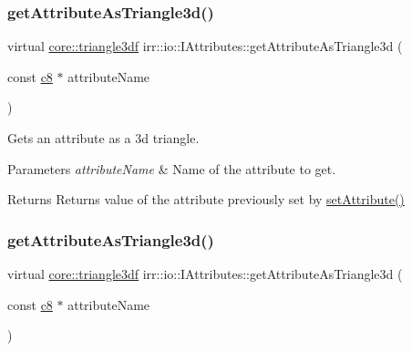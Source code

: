 \subsubsection{\texorpdfstring{get\+Attribute\+As\+Triangle3d()}{getAttributeAsTriangle3d()}\hspace{0.1cm}{\footnotesize\ttfamily [1/4]}}
{\footnotesize\ttfamily virtual \hyperlink{namespaceirr_1_1core_a8983bda2678a7a67d97bf3c7be6c31c7}{core\+::triangle3df} irr\+::io\+::\+I\+Attributes\+::get\+Attribute\+As\+Triangle3d (\begin{DoxyParamCaption}\item[{const \hyperlink{namespaceirr_a9395eaea339bcb546b319e9c96bf7410}{c8} $\ast$}]{attribute\+Name }\end{DoxyParamCaption})\hspace{0.3cm}{\ttfamily [pure virtual]}}



Gets an attribute as a 3d triangle. 


\begin{DoxyParams}{Parameters}
{\em attribute\+Name} & Name of the attribute to get. \\
\hline
\end{DoxyParams}
\begin{DoxyReturn}{Returns}
Returns value of the attribute previously set by \hyperlink{classirr_1_1io_1_1IAttributes_a03fa31acb481ae23678676cc183f09a6}{set\+Attribute()} 
\end{DoxyReturn}
\mbox{\label{classirr_1_1io_1_1IAttributes_a11b477925de4a257400cc7c920ec5e40}} 
\subsubsection{\texorpdfstring{get\+Attribute\+As\+Triangle3d()}{getAttributeAsTriangle3d()}\hspace{0.1cm}{\footnotesize\ttfamily [2/4]}}
{\footnotesize\ttfamily virtual \hyperlink{namespaceirr_1_1core_a8983bda2678a7a67d97bf3c7be6c31c7}{core\+::triangle3df} irr\+::io\+::\+I\+Attributes\+::get\+Attribute\+As\+Triangle3d (\begin{DoxyParamCaption}\item[{const \hyperlink{namespaceirr_a9395eaea339bcb546b319e9c96bf7410}{c8} $\ast$}]{attribute\+Name }\end{DoxyParamCaption})\hspace{0.3cm}{\ttfamily [pure virtual]}}



